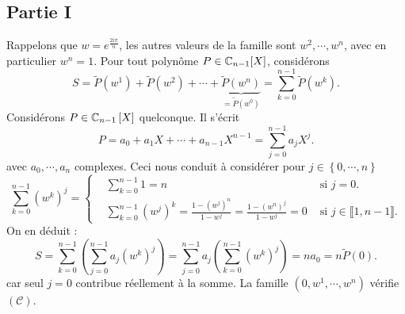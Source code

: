 \subsection*{Partie I}
Rappelons que $w = e^{\frac{2i\pi }{n}}$, les autres valeurs de la famille sont $w^2, \cdots, w^n$, avec en particulier $w^{n}=1$. Pour tout polyn\^{o}me $P\in \mathbb{C}_{n-1}[X]$, consid\'{e}rons 
\[
S = \widetilde{P}(w^{1}) + \widetilde{P}(w^{2}) + \cdots + \underset{=\widetilde{P}(w^{0})}{\underbrace{\widetilde{P}(w^{n})}}
 = \sum_{k=0}^{n-1}\widetilde{P}(w^{k}). 
\]
Considérons $P\in \mathbb{C}_{n-1}\left[ X\right] $ quelconque. Il s'écrit
\[
P = a_{0} + a_{1}X + \cdots + a_{n-1}X^{n-1} = \sum_{j=0}^{n-1}a_j X^{j}.
\]
avec 
$a_0, \cdots, a_n$ complexes.
Ceci nous conduit \`{a} consid\'{e}rer pour $j\in \left\{ 0,\cdots ,n\right\}$ 
\begin{displaymath}
\sum_{k=0}^{n-1}(w^{k})^{j} 
=\left\lbrace 
\begin{aligned}
 &\sum_{k=0}^{n-1}1 = n &\text{ si } j=0 .\\
 &\sum_{k=0}^{n-1}(w^{j})^{k} = \frac{1-(w^{j})^{n}}{1-w^{j}} = \frac{1-(w^{n})^{j}}{1-w^{j}}=0 &\text{ si } j\in \llbracket 1, n-1\rrbracket.
\end{aligned}
\right. 
\end{displaymath}
On en d\'{e}duit : 
\[
S = \sum_{k=0}^{n-1}\left( \sum_{j=0}^{n-1}a_j (w^k)^j\right) 
= \sum_{j=0}^{n-1}a_{j}\left( \sum_{k=0}^{n-1}(w^{k})^{j}\right) 
= na_{0}=n\widetilde{P}(0) .
\]
car seul $j=0$ contribue réellement à la somme. La famille $(0,w^{1},\cdots , w^{n})$ v\'{e}rifie $(\mathcal{C})$.


